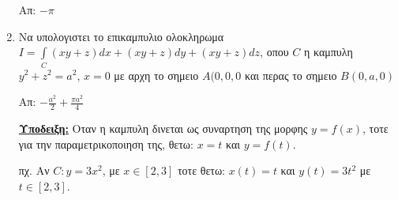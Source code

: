 \begin{enumerate}
\hfill Απ: $-\pi$

\item Να υπολογιστει το επικαμπυλιο ολοκληρωμα $I=\int\limits_C (xy+z)dx+(xy+z)dy+(xy+z)dz$, οπου $C$ η καμπυλη $y^2+z^2=a^2$, $x=0$ με αρχη το σημειο $A(0,0,0$ και περας το σημειο $B(0,a,0)$

\hfill Απ: $-\frac{a^2}{2}+\frac{\pi a^2}{4}$

\underline{\textbf{Υποδειξη:}}
Οταν η καμπυλη δινεται ως συναρτηση της μορφης $y=f(x)$, τοτε για την παραμετρικοποιηση της, θετω: $x=t$ και $y=f(t)$. 

πχ. Αν $C:y=3x^2$, με $x\in [2,3]$ τοτε θετω: $x(t)=t$ και $y(t)=3t^2$ με $t\in [2,3]$.

\end{enumerate}


